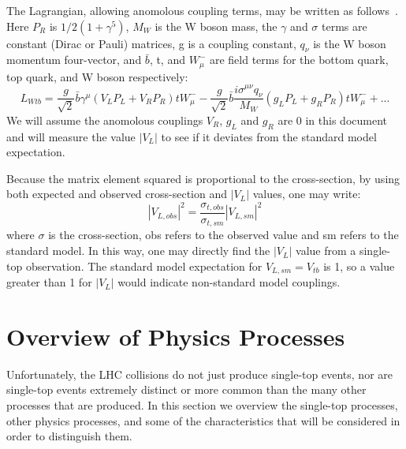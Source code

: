 The Lagrangian, allowing anomolous coupling terms, may be written as follows~\cite{Vtbtheory2, Vtbtheory}.  Here $P_R$ is $1/2(1+\gamma^5)$, $M_W$ is the W boson mass, the $\gamma$ and $\sigma$ terms are constant (Dirac or Pauli) matrices, g is a coupling constant, $q_{\nu}$ is the W boson momentum four-vector, and $\bar{b}$, t, and $W^{-}_{\mu}$ are field terms for the bottom quark, top quark, and W boson respectively:
\begin{equation}
L_{Wtb} = \frac{g}{\sqrt{2}}\bar{b}\gamma^{\mu}(V_L P_L + V_R P_R )tW^{-}_{\mu} - \frac{g}{\sqrt{2}}\bar{b} \frac{i\sigma^{\mu\nu}q_{\nu}}{M_W} (g_L P_L + g_R P_R )tW^{-}_{\mu} + ... 
\end{equation}
We will assume the anomolous couplings $V_R$, $g_L$ and $g_R$ are 0 in this document and will measure the value $|V_L|$ to see if it deviates from the standard model expectation.

Because the matrix element squared is proportional to the cross-section, by using both expected and observed cross-section and $|V_{L}|$ values, one may write:
\begin{equation} |V_{L,obs}|^2=\frac{\sigma_{t,obs}}{\sigma_{t,sm}}|V_{L,sm}|^2
\label{eq:vtbxs}
\end{equation}
where $\sigma$ is the cross-section, obs refers to the observed value and sm refers to the standard model.  In this way, one may directly find the $|V_{L}|$ value from a single-top observation.  The standard model expectation for $V_{L,sm} = V_{tb}$ is 1, so a value greater than 1 for $|V_{L}|$ would indicate non-standard model couplings.

\section{Overview of Physics Processes}
Unfortunately, the LHC collisions do not just produce single-top events, nor are single-top events extremely distinct or more common than the many other processes that are produced.  In this section we overview the single-top processes, other physics processes, and some of the characteristics that will be considered in order to distinguish them.

